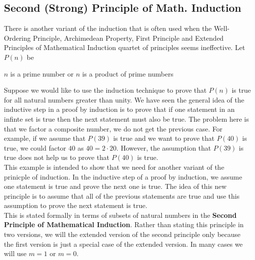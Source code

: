 \documentclass{book}
\theoremstyle{definition}
\theoremstyle{remark}
\newcommand{\m}{\cdot}
\begin{document}
\newpage
\subsection{Second (Strong) Principle of Math. Induction}

There is another variant of the induction that is often used when the Well-Ordering Principle, Archimedean Property, First Principle and Extended Principles of Mathematical Induction quartet of principles seems ineffective. Let $P(n)$ be
    \begin{center}
        $n$ is a prime number or $n$ is a product of prime numbers
    \end{center}
Suppose we would like to use the induction technique to prove that  $P(n)$ is true for all natural numbers greater than unity. We have seen the general idea of the inductive step in a proof by induction is to prove that if one statement in an infinte set is true then the next statement must also be true. The problem here is that we factor a composite number, we do not get the previous case. For example, if we assume that $P(39)$ is true and we want to prove that $P(40)$ is true, we could factor $40$ as $40 = 2 \m 20$. However, the assumption that $P(39)$ is true does not help us to prove that $P(40)$ is true. \\

This example is intended to show that we need for another variant of the prinicple of induction. In the inductive step of a proof by induction, we assume one statement is true and prove the next one is true. The idea of this new principle is to assume that all of the previous statements are true and use this assumption to prove the next statement is true. \\

This is stated formally in terms of subsets of natural numbers in the \textbf{Second Principle of Mathematical Induction}. Rather than stating this principle in two versions, we will the extended version of the second principle only because the first version is just a special case of the extended version. In many cases we will use $m=1$ or $m=0$.
\end{document}

